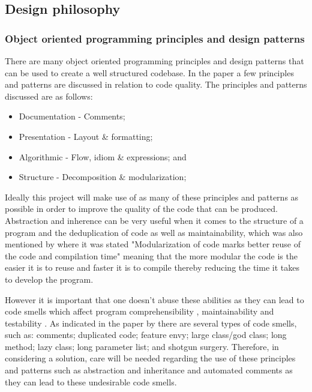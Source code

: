 \subsection{Design philosophy}
\label{sec:DesignPhilosophy}

\subsubsection{Object oriented programming principles and design patterns}
There are many object oriented programming principles and design patterns that can be used to create a well structured codebase. In the paper \cite{10.1145/3428029.3428047} a few principles and patterns are discussed in relation to code quality. The principles and patterns discussed are as follows:
\begin{itemize}
	\item Documentation - Comments;
	\item Presentation - Layout \& formatting;
	\item Algorithmic - Flow, idiom \& expressions; and
	\item Structure - Decomposition \& modularization;
\end{itemize}

Ideally this project will make use of as many of these principles and patterns as possible in order to improve the quality of the code that can be produced. Abstraction and inherence can be very useful when it comes to the structure of a program and the deduplication of code as well as maintainability, which was also mentioned by \cite{8681007} where it was stated "Modularization of code marks better reuse of the code and compilation time" meaning that the more modular the code is the easier it is to reuse and faster it is to compile thereby reducing the time it takes to develop the program.

However it is important that one doesn't abuse these abilities as they can lead to code smells which affect program comprehensibility \citep{8681007, ImpactOfAntipatterns}, maintainability \citep{8681007, ImpactOfAntipatterns2, CodeSmellsAndMaintainability} and testability \citep{8681007, TestCasesAndCodeQuality}. As indicated in the paper by \cite{10.1145/3555228.3555268} there are several types of code smells, such as: comments; duplicated code; feature envy; large class/god class; long method; lazy class; long parameter list; and shotgun surgery. Therefore, in considering a solution, care will be needed regarding the use of these principles and patterns such as abstraction and inheritance and automated comments as they can lead to these undesirable code smells.

